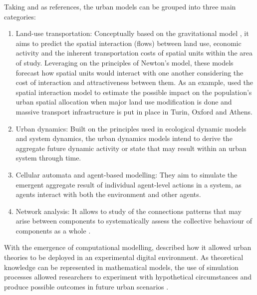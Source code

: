 \documentclass[12pt, a4paper]{report}
\begin{document}
Taking \cite{battyUrbanModeling2009a} and \cite{wilsonFutureUrbanModelling2018} as references, the urban models can be grouped into three main categories: 

\begin{enumerate}
  \item Land-use transportation: Conceptually based on the gravitational model \citep{wilsonFamilySpatialInteraction1971a}, it aims to predict the spatial interaction (flows) between land use, economic activity and the inherent transportation costs of spatial units within the area of study. Leveraging on the principles of Newton's model, these models forecast how spatial units would interact with one another considering the cost of interaction and attractiveness between them. As an example, \cite{lopaneLanduseTransportinteractionFramework2023} used the spatial interaction model to estimate the possible impact on the population's urban spatial allocation when major land use modification is done and massive transport infrastructure is put in place in Turin, Oxford and Athens.
  \item Urban dynamics: Built on the principles used in ecological dynamic models and system dynamics, the urban dynamics models intend to derive the aggregate future dynamic activity or state that may result within an urban system through time.
  \item Cellular automata and agent-based modelling: They aim to simulate the emergent aggregate result of individual agent-level actions in a system, as agents interact with both the environment and other agents.
  \item Network analysis: It allows to study of the connections patterns that may arise between components to systematically assess the collective behaviour of components as a whole \citep{newmanNetworksIntroduction2010}.
\end{enumerate}

With the emergence of computational modelling, \cite{battyUrbanModeling2009a} described how it allowed urban theories to be deployed in an experimental digital environment. As theoretical knowledge can be represented in mathematical models, the use of simulation processes allowed researchers to experiment with hypothetical circumstances and produce possible outcomes in future urban scenarios \citep{battyUrbanModeling2009a}.

\end{document}
